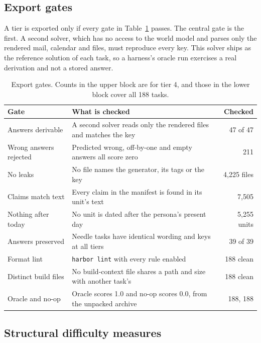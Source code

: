 \documentclass{article}
\newcommand{\code}[1]{\texttt{\small #1}}
\begin{document}
\subsection{Export gates}
\label{sec:gates}

A tier is exported only if every gate in Table~\ref{tab:gates} passes. The central gate is the first. A second solver, which has no access to the world model and parses only the rendered mail, calendar and files, must reproduce every key. This solver ships as the reference solution of each task, so a harness's oracle run exercises a real derivation and not a stored answer.

\begin{table}[t]
  \caption{Export gates. Counts in the upper block are for tier 4, and those in the lower block cover all 188 tasks.}
  \label{tab:gates}
  \centering
  \small
  \begin{tabular}{@{}lp{7.6cm}r@{}}
    \toprule
    Gate & What is checked & Checked \\
    \midrule
    Answers derivable      & A second solver reads only the rendered files and matches the key & 47 of 47 \\
    Wrong answers rejected & Predicted wrong, off-by-one and empty answers all score zero & 211 \\
    No leaks               & No file names the generator, its tags or the key & 4{,}225 files \\
    Claims match text      & Every claim in the manifest is found in its unit's text & 7{,}505 \\
    Nothing after today    & No unit is dated after the persona's present day & 5{,}255 units \\
    \midrule
    Answers preserved      & Needle tasks have identical wording and keys at all tiers & 39 of 39 \\
    Format lint            & \code{harbor lint} with every rule enabled & 188 clean \\
    Distinct build files   & No build-context file shares a path and size with another task's & 188 clean \\
    Oracle and no-op       & Oracle scores 1.0 and no-op scores 0.0, from the unpacked archive & 188, 188 \\
    \bottomrule
  \end{tabular}
\end{table}

\subsection{Structural difficulty measures}
\label{sec:measures}
\end{document}
